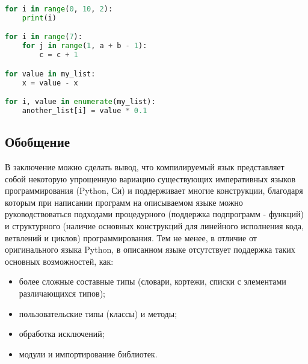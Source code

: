 \begin{lstlisting}[language=Python, caption=Примеры циклов со счетчиком]
for i in range(0, 10, 2):
    print(i)

for i in range(7):
    for j in range(1, a + b - 1):
        c = c + 1

for value in my_list:
    x = value - x

for i, value in enumerate(my_list):
    another_list[i] = value * 0.1
\end{lstlisting}

\subsection{Обобщение}

В заключение можно сделать вывод, что компилируемый язык представляет собой некоторую упрощенную вариацию существующих императивных языков программирования (Python, Си) и поддерживает многие конструкции, благодаря которым при написании программ на описываемом языке можно руководствоваться подходами процедурного (поддержка подпрограмм - функций) и структурного (наличие основных конструкций для линейного исполнения кода, ветвлений и циклов) программирования.
Тем не менее, в отличие от оригинального языка Python, в описанном языке отсутствует поддержка таких основных возможностей, как:

\begin{itemize}
    \item более сложные составные типы (словари, кортежи, списки с элементами различающихся типов);
    \item пользовательские типы (классы) и методы;
    \item обработка исключений;
    \item модули и импортирование библиотек.
\end{itemize}
